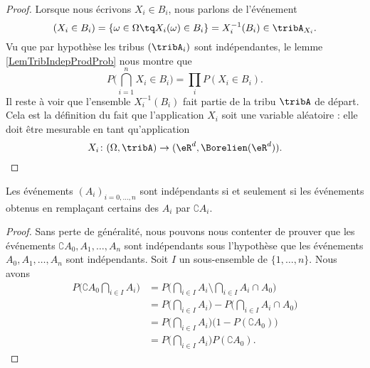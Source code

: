 \begin{proof}
    Lorsque nous écrivons \( X_i\in B_i\), nous parlons de l'événement
    \begin{equation}
        (X_i\in B_i)=\{ \omega\in\Omega\tq X_i(\omega)\in B_i \}=X_i^{-1}(B_i)\in \tribA_{X_i}.
    \end{equation}
    Vu que par hypothèse les tribus \( (\tribA_i)\) sont indépendantes, le lemme \ref{LemTribIndepProdProb} nous montre que
    \begin{equation}
        P\big( \bigcap_{i=1}^nX_i\in B_i \big)=\prod_iP(X_i\in B_i).
    \end{equation}
    Il reste à voir que l'ensemble \( X_i^{-1}(B_i)\) fait partie de la tribu \( \tribA\) de départ. Cela est la définition du fait que l'application \( X_i\) soit une variable aléatoire : elle doit être mesurable en tant qu'application
    \begin{equation}
        X_i\colon (\Omega,\tribA)\to (\eR^d,\Borelien(\eR^d)).
    \end{equation}
\end{proof}

\begin{lemma}       \label{LemIndepEvenCompl}
    Les événements \( (A_i)_{i=0,\ldots,n}\) sont indépendants si et seulement si les événements obtenus en remplaçant certains des \( A_i\) par \( \complement A_i\).
\end{lemma}

\begin{proof}
    Sans perte de généralité, nous pouvons nous contenter de prouver que les événements \( \complement A_0,A_1,\ldots,A_n\) sont indépendants sous l'hypothèse que les événements \( A_0,A_1,\ldots,A_n\) sont indépendants. Soit \( I\) un sous-ensemble de \( \{ 1,\ldots,n \}\). Nous avons
    \begin{subequations}
        \begin{align}
            P\big( \complement A_0\bigcap_{i\in I}A_i \big)&=P\big( \bigcap_{i\in I}A_i\setminus\bigcap_{i\in I}A_i\cap A_0 \big)\\
            &=P\big( \bigcap_{i\in I}A_i \big)-P\big( \bigcap_{i\in I}A_i\cap A_0 \big)\\
            &=P\big( \bigcap_{i\in I}A_i \big)\big( 1-P(\complement A_0) \big)\\
            &=P\big( \bigcap_{i\in I}A_i \big)P(\complement A_0).
        \end{align}
    \end{subequations}
\end{proof}

